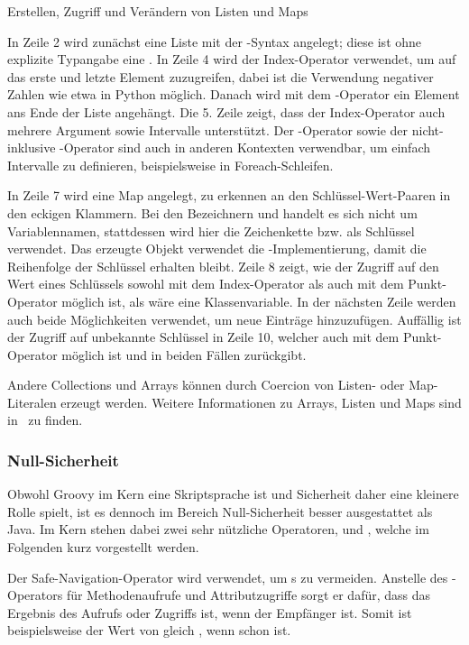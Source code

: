 \documentclass[a4paper]{article}
\newcommand{\codelisting}[3]{
\begin{listing}[ht]
	\inputminted{#1}{#1/#2}
	\vspace{-3ex}
	\caption{#3}
	\label{lst:#2}
\end{listing}
}
\begin{document}
\codelisting{groovy}{lists-and-maps.groovy}{Erstellen, Zugriff und Verändern von Listen und Maps}

In Zeile 2 wird zunächst eine Liste mit der \code{[]}-Syntax angelegt;
diese ist ohne explizite Typangabe eine .
In Zeile 4 wird der Index-Operator verwendet, um auf das erste und letzte Element zuzugreifen, dabei ist die Verwendung negativer Zahlen wie etwa in Python möglich.
Danach wird mit dem \code{<<}-Operator ein Element ans Ende der Liste angehängt.
Die 5. Zeile zeigt, dass der Index-Operator auch mehrere Argument sowie Intervalle unterstützt.
Der -Operator sowie der nicht-inklusive -Operator sind auch in anderen Kontexten verwendbar, um einfach Intervalle zu definieren, beispielsweise in Foreach-Schleifen.

In Zeile 7 wird eine Map angelegt, zu erkennen an den Schlüssel-Wert-Paaren in den eckigen Klammern.
Bei den Bezeichnern  und  handelt es sich nicht um Variablennamen, stattdessen wird hier die Zeichenkette  bzw.  als Schlüssel verwendet.
Das erzeugte Objekt verwendet die -Implementierung, damit die Reihenfolge der Schlüssel erhalten bleibt.
Zeile 8 zeigt, wie der Zugriff auf den Wert eines Schlüssels sowohl mit dem Index-Operator als auch mit dem Punkt-Operator möglich ist, als wäre  eine Klassenvariable.
In der nächsten Zeile werden auch beide Möglichkeiten verwendet, um neue Einträge hinzuzufügen.
Auffällig ist der Zugriff auf unbekannte Schlüssel in Zeile 10, welcher auch mit dem Punkt-Operator möglich ist und in beiden Fällen  zurückgibt.

Andere Collections und Arrays können durch Coercion von Listen- oder Map-Literalen erzeugt werden.
Weitere Informationen zu Arrays, Listen und Maps sind in~\cite[Abs.~7.-9.]{groovy-lang:syntax} zu finden.

\subsubsection{Null-Sicherheit}

Obwohl Groovy im Kern eine Skriptsprache ist und Sicherheit daher eine kleinere Rolle spielt, ist es dennoch im Bereich Null-Sicherheit besser ausgestattet als Java.
Im Kern stehen dabei zwei sehr nützliche Operatoren,  und , welche im Folgenden kurz vorgestellt werden.

Der Safe-Navigation-Operator  wird verwendet, um s zu vermeiden.
Anstelle des -Operators für Methodenaufrufe und Attributzugriffe sorgt er dafür, dass das Ergebnis des Aufrufs oder Zugriffs  ist, wenn der Empfänger  ist.
Somit ist beispielsweise der Wert von  gleich , wenn  schon  ist.
\end{document}
